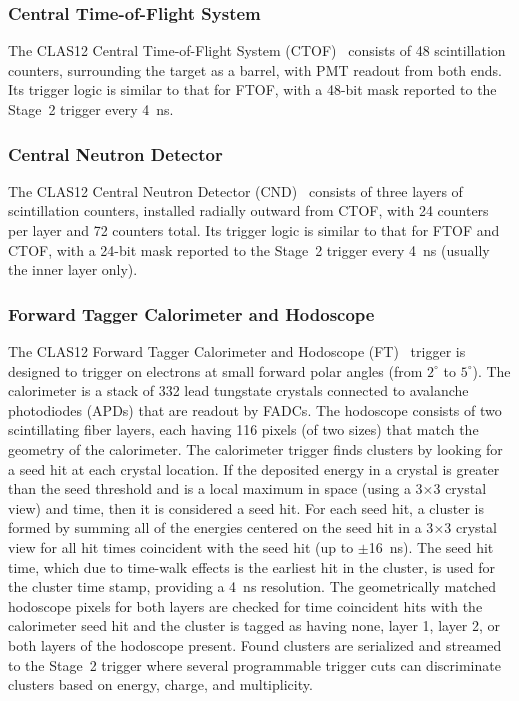 \subsubsection{Central Time-of-Flight System}

The CLAS12 Central Time-of-Flight System (CTOF)~\cite{ctof-ref} consists of 48 scintillation counters,
surrounding the target as a barrel, with PMT readout from both ends. Its trigger logic is similar to that for
FTOF, with a 48-bit mask reported to the Stage~2 trigger every 4~ns.


\subsubsection{Central Neutron Detector}

The CLAS12 Central Neutron Detector (CND)~\cite{cnd-ref} consists of three layers of scintillation counters,
installed radially outward from CTOF, with 24 counters per layer and 72 counters total. Its trigger logic is similar
to that for FTOF and CTOF, with a 24-bit mask reported to the Stage~2 trigger every 4~ns (usually the inner
layer only).

\subsubsection{Forward Tagger Calorimeter and Hodoscope}

The CLAS12 Forward Tagger Calorimeter and Hodoscope (FT)~\cite{ft-ref} trigger is designed to trigger on
electrons at small forward polar angles (from $2^\circ$  to $5^\circ$). The calorimeter is a stack of 332 lead
tungstate crystals connected to avalanche photodiodes (APDs) that are readout by FADCs. The hodoscope
consists of two scintillating fiber layers, each having 116 pixels (of two sizes) that match the geometry of the
calorimeter. The calorimeter trigger finds clusters by looking for a seed hit at each crystal location. If the
deposited energy in a crystal is greater than the seed threshold and is a local maximum in space (using a
3$\times$3 crystal view) and time, then it is considered a seed hit. For each seed hit, a cluster is formed by
summing all of the energies centered on the seed hit in a 3$\times$3 crystal view for all hit times coincident
with the seed hit (up to $\pm$16~ns). The seed hit time, which due to time-walk effects is the earliest hit in
the cluster, is used for the cluster time stamp, providing a 4~ns resolution. The geometrically matched hodoscope
pixels for both layers are checked for time coincident hits with the calorimeter seed hit and the cluster is
tagged as having none, layer 1, layer 2, or both layers of the hodoscope present. Found clusters are serialized
and streamed to the Stage~2 trigger where several programmable trigger cuts can discriminate clusters based
on energy, charge, and multiplicity.

